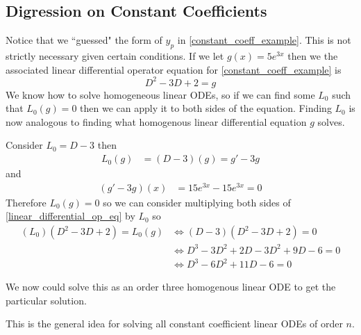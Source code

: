 \documentclass[notes]{subfiles}
\begin{document}
\subsection{Digression on Constant Coefficients}
Notice that we ``guessed" the form of $y_p$ in \cref{constant_coeff_example}. This is not strictly necessary given certain conditions. If we let $g(x) = 5e^{3x}$ then we the associated linear differential operator equation for \cref{constant_coeff_example} is
\begin{equation} \tag{$\star$} \label{linear_differential_op_eq}
    D^2 - 3D + 2 = g
\end{equation}
We know how to solve homogeneous linear ODEs, so if we can find some $L_0$ such that $L_0(g) = 0$ then we can apply it to both sides of the equation. Finding $L_0$ is now analogous to finding what homogenous linear differential equation $g$ solves.

Consider $L_0 = D - 3$ then
\begin{align*}
    L_0(g)
    &= (D - 3)(g)
    = g' - 3g
\end{align*}
and
\begin{align*}
    (g' - 3g)(x)
    &= 15e^{3x} - 15e^{3x}
    = 0
\end{align*}
Therefore $L_0(g) = 0$ so we can consider multiplying both sides of \eqref{linear_differential_op_eq} by $L_0$ so
\begin{align*}
    (L_0)(D^2 - 3D + 2) = L_0(g)
    &\iff (D - 3)(D^2 - 3D + 2) = 0 \\
    &\iff D^3 - 3D^2 + 2D - 3D^2 + 9D - 6 = 0 \\
    &\iff D^3 - 6D^2 + 11D - 6 = 0
\end{align*}

We now could solve this as an order three homogenous linear ODE to get the particular solution.

This is the general idea for solving all constant coefficient linear ODEs of order $n$.
\end{document}
